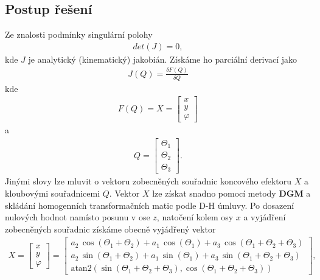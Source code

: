 \documentclass{article}
\begin{document}
		\subsection{Postup řešení}
			Ze znalosti podmínky singulární polohy 
				\begin{align}
					det(J)=0,
				\end{align}
			kde \(J\) je analytický (kinematický) jakobián. Získáme ho parciální derivací jako 
				\begin{align}
					J(Q) =\frac{\delta F(Q)}{\delta Q}
				\end{align}
			kde 
				\begin{align}
					F(Q)=X=\begin{bmatrix}x\\ y\\ \varphi\end{bmatrix}
				\end{align}
			a 
				\begin{align}
					Q=\begin{bmatrix}\Theta_{1}\\ \Theta_{2}\\ \Theta_{3}\end{bmatrix}.
				\end{align}
			Jinými slovy lze mluvit o vektoru zobecněných souřadnic koncového efektoru \(X\) a kloubovými souřadnicemi \(Q\). Vektor \(X\) lze získat snadno pomocí metody \textbf{DGM} a skládání homogenních transformačních matic podle D-H úmluvy. Po dosazení nulových hodnot namísto posunu v ose \(z\), natočení kolem osy \(x\) a vyjádření zobecněných souřadnic získáme obecně vyjádřený vektor 
				\begin{align}
					X=\begin{bmatrix}x\\ y\\ \varphi\end{bmatrix}=\begin{bmatrix}
					a_2 \,\cos \left(\Theta_1 +\Theta_2 \right)+a_1 \,\cos \left(\Theta_1 \right)+a_3\,\cos\left(\Theta_1 +\Theta_2 +\Theta_3 \right)\\
					a_2 \,\sin \left(\Theta_1 +\Theta_2 \right)+a_1 \,\sin \left(\Theta_1 \right)+a_3\,\sin\left(\Theta_1 +\Theta_2 +\Theta_3 \right)\\
					\textrm{atan2}\left(\sin \left(\Theta_1 +\Theta_2 +\Theta_3 \right),\cos \left(\Theta_1+\Theta_2+\Theta_3 \right)\right)
					\end{bmatrix},
				\end{align}
\end{document}
